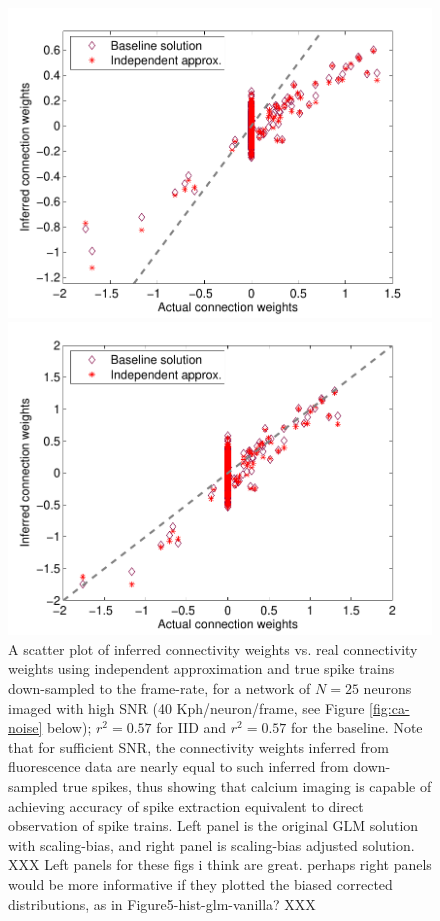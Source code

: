 \begin{figure}[h]
\centering
\begin{minipage}[c]{0.45\hsize}
\includegraphics[width=\hsize]{../figs/Figure2_fluor_base_vs_iid}
\end{minipage}
\begin{minipage}[c]{0.45\hsize}
\includegraphics[width=\hsize]{../figs/Figure2b_fluor_base_vs_iid}
\end{minipage}
\caption{A scatter plot of inferred connectivity weights vs. real connectivity weights using independent approximation and true spike trains down-sampled to the frame-rate, for a network of $N=25$ neurons imaged with high SNR (40 Kph/neuron/frame, see Figure \ref{fig:ca-noise} below); $r^2=0.57$ for IID and $r^2=0.57$ for the baseline. Note that for sufficient SNR, the connectivity weights inferred from fluorescence data are nearly equal to such inferred from down-sampled true spikes, thus showing that calcium imaging is capable of achieving accuracy of spike extraction equivalent to direct observation of spike trains. Left panel is the original GLM solution with scaling-bias, and right panel is scaling-bias adjusted solution.  XXX Left panels for these figs i think are great.  perhaps right panels would be more informative if they plotted the biased corrected distributions, as in Figure5-hist-glm-vanilla? XXX}
\label{fig:iid-base}
\end{figure}

